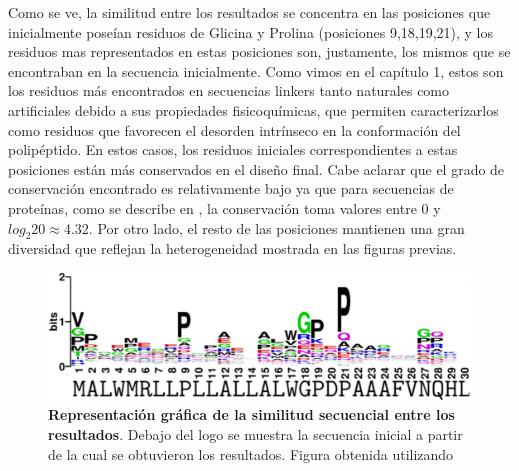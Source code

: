 Como se ve, la similitud entre los resultados se concentra en las posiciones que inicialmente 
poseían residuos de Glicina y Prolina (posiciones 9,18,19,21), y los residuos mas representados en estas posiciones son, justamente, los mismos que se encontraban en la secuencia inicialmente. 
Como vimos en el capítulo 1, estos son los residuos más encontrados en secuencias linkers tanto naturales como artificiales debido a sus propiedades fisicoquímicas, 
que permiten caracterizarlos como residuos que favorecen el desorden intrínseco en la conformación del polipéptido.
En estos casos, los residuos iniciales correspondientes a estas posiciones están más conservados en el diseño final.
Cabe aclarar que el grado de conservación encontrado es relativamente bajo ya que para secuencias de proteínas, como se describe en \cite{crooks2004weblogo}, la conservación toma valores entre $0$ y $log_2 20 \approx 4.32$.  
Por otro lado, el resto de las posiciones mantienen una gran diversidad que reflejan la heterogeneidad mostrada en las figuras previas.

\begin{figure}[htbp]
\includegraphics[width=\textwidth]{img/resultados/logoInitial.png}
\caption{\textbf{Representación gráfica de la similitud secuencial entre los resultados}. Debajo del logo se muestra la secuencia inicial a partir de la cual se obtuvieron los resultados. Figura obtenida utilizando \cite{crooks2004weblogo}}
\label{fig:logo}
\end{figure}



